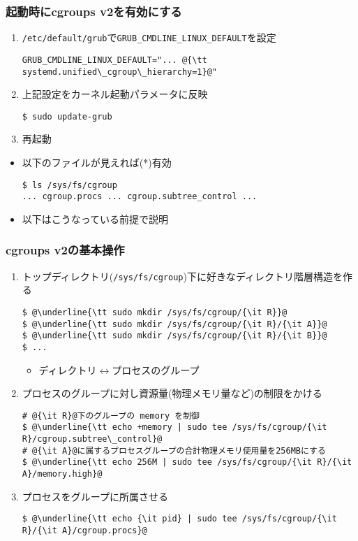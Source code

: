 \documentclass[12pt,dvipdfmx]{beamer}
\begin{document}
\begin{frame}[fragile]
  \frametitle{起動時にcgroups v2を有効にする}
  \begin{enumerate}
  \item {\tt /etc/default/grub}で{\tt GRUB\_CMDLINE\_LINUX\_DEFAULT}を設定
\begin{lstlisting}
GRUB_CMDLINE_LINUX_DEFAULT="... @{\tt systemd.unified\_cgroup\_hierarchy=1}@"
\end{lstlisting}
\item 上記設定をカーネル起動パラメータに反映
\begin{lstlisting}
$ sudo update-grub
\end{lstlisting} %
\item 再起動
\end{enumerate}

\begin{itemize}
\item 以下のファイルが見えれば(*)有効
\begin{lstlisting}
$ ls /sys/fs/cgroup
... cgroup.procs ... cgroup.subtree_control ...
\end{lstlisting} %

\item 以下はこうなっている前提で説明
\end{itemize}
\end{frame}

\begin{frame}[fragile]
\frametitle{cgroups v2の基本操作}
\begin{enumerate}
\item トップディレクトリ({\tt /sys/fs/cgroup})下に好きなディレクトリ階層構造を作る
\begin{lstlisting}
$ @\underline{\tt sudo mkdir /sys/fs/cgroup/{\it R}}@
$ @\underline{\tt sudo mkdir /sys/fs/cgroup/{\it R}/{\it A}}@
$ @\underline{\tt sudo mkdir /sys/fs/cgroup/{\it R}/{\it B}}@
$ ...
\end{lstlisting} %
\begin{itemize}
\item ディレクトリ$\leftrightarrow$プロセスのグループ
\end{itemize}
\item プロセスのグループに対し資源量(物理メモリ量など)の制限をかける
\begin{lstlisting}
# @{\it R}@下のグループの memory を制御
$ @\underline{\tt echo +memory | sudo tee /sys/fs/cgroup/{\it R}/cgroup.subtree\_control}@
# @{\it A}@に属するプロセスグループの合計物理メモリ使用量を256MBにする
$ @\underline{\tt echo 256M | sudo tee /sys/fs/cgroup/{\it R}/{\it A}/memory.high}@
\end{lstlisting} %
\item プロセスをグループに所属させる
\begin{lstlisting}
$ @\underline{\tt echo {\it pid} | sudo tee /sys/fs/cgroup/{\it R}/{\it A}/cgroup.procs}@
\end{lstlisting} %
\end{enumerate}
\end{frame}
\end{document}

